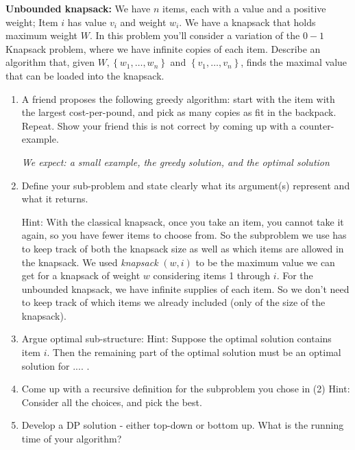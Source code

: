 \documentclass{report}
\begin{document}
\newpage
    \qs {} {
\textbf{Unbounded knapsack:} We have $n$ items, each with a value and a positive weight; Item $i$ has value $v_i$ and weight $w_i$. We have a knapsack that holds maximum weight $W$. In this problem you'll consider a variation of the $0-1$ Knapsack problem, where we have infinite copies of each item. Describe an algorithm that, given $W,\left\{w_1, \ldots, w_n\right\}$ and $\left\{v_1, \ldots, v_n\right\}$, finds the maximal value that can be loaded into the knapsack.

  \begin{enumerate}
    \item A friend proposes the following greedy algorithm: start with the item with the largest cost-per-pound, and pick as many copies as fit in the backpack. Repeat.
Show your friend this is not correct by coming up with a counter-example.

    \textit{We expect: a small example, the greedy solution, and the optimal solution}
    \item Define your sub-problem and state clearly what its argument(s) represent and what it returns.

      Hint: With the classical knapsack, once you take an item, you cannot take it again, so you have fewer items to choose from. So the subproblem we use has to keep track of both the knapsack size as well as which items are allowed in the knapsack. We used \emph{knapsack} $(w, i)$ to be the maximum value we can get for a knapsack of weight $w$ considering items 1 through $i$. For the unbounded knapsack, we have infinite supplies of each item. So we don't need to keep track of which items we already included (only of the size of the knapsack).

    \item Argue optimal sub-structure:
      Hint: Suppose the optimal solution contains item $i$. Then the remaining part of the optimal solution must be an optimal solution for .... .

    \item Come up with a recursive definition for the subproblem you chose in (2)
    Hint: Consider all the choices, and pick the best.

  \item Develop a DP solution - either top-down or bottom up. What is the running time of your algorithm?

  \end{enumerate}
    }
\end{document}
